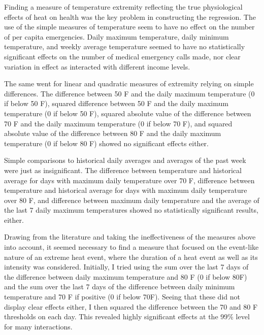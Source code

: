 \documentclass[11pt, oneside]{article}      %
\begin{document}
Finding a measure of temperature extremity reflecting the true physiological effects of heat on health was the key problem in constructing the regression. The use of the simple measures of temperature seem to have no effect on the number of per capita emergencies. Daily maximum temperature, daily minimum temperature, and weekly average temperature seemed to have no statistically significant effects on the number of medical emergency calls made, nor clear variation in effect as interacted with different income levels.

The same went for linear and quadratic measures of extremity relying on simple differences. The difference between 50 F and the daily maximum temperature (0 if below 50 F), squared difference between 50 F and the daily maximum temperature (0 if below 50 F), squared absolute value of the difference between 70 F and the daily maximum temperature (0 if below 70 F), and squared absolute value of the difference between 80 F and the daily maximum temperature (0 if below 80 F) showed no significant effects either.

Simple comparisons to historical daily averages and averages of the past week were just as insignificant. The difference between temperature and historical average for days with maximum daily temperature over 70 F, difference between temperature and historical average for days with maximum daily temperature over 80 F, and difference between maximum daily temperature and the average of the last 7 daily maximum temperatures showed no statistically significant results, either.

Drawing from the literature and taking the ineffectiveness of the measures above into account, it seemed necessary to find a measure that focused on the event-like nature of an extreme heat event, where the duration of a heat event as well as its intensity was considered. Initially, I tried using the sum over the last 7 days of the difference between daily maximum temperature and 80 F (0 if below 80F) and the sum over the last 7 days of the difference between daily minimum temperature and 70 F if positive (0 if below 70F). Seeing that these did not display clear effects either, I then squared the difference between the 70 and 80 F thresholds on each day. This revealed highly significant effects at the 99\% level for many interactions.
\end{document}
